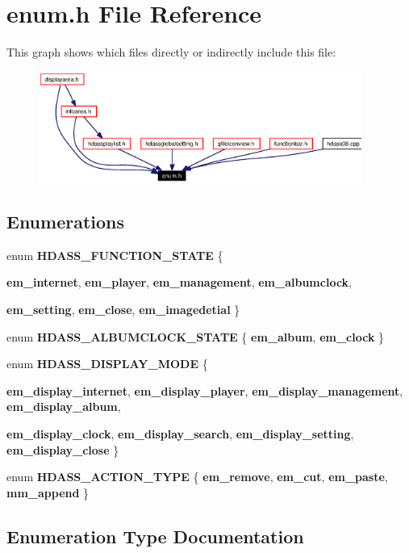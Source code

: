 \section{enum.h File Reference}
\label{enum_8h}




This graph shows which files directly or indirectly include this file:\begin{figure}[H]
\begin{center}
\leavevmode
\includegraphics[width=300pt]{enum_8h__dep__incl}
\end{center}
\end{figure}
\subsection*{Enumerations}
\begin{CompactItemize}
\item 
enum {\bf HDASS\_\-FUNCTION\_\-STATE} \{ \par
{\bf em\_\-internet}, 
{\bf em\_\-player}, 
{\bf em\_\-management}, 
{\bf em\_\-albumclock}, 
\par
{\bf em\_\-setting}, 
{\bf em\_\-close}, 
{\bf em\_\-imagedetial}
 \}
\item 
enum {\bf HDASS\_\-ALBUMCLOCK\_\-STATE} \{ {\bf em\_\-album}, 
{\bf em\_\-clock}
 \}
\item 
enum {\bf HDASS\_\-DISPLAY\_\-MODE} \{ \par
{\bf em\_\-display\_\-internet}, 
{\bf em\_\-display\_\-player}, 
{\bf em\_\-display\_\-management}, 
{\bf em\_\-display\_\-album}, 
\par
{\bf em\_\-display\_\-clock}, 
{\bf em\_\-display\_\-search}, 
{\bf em\_\-display\_\-setting}, 
{\bf em\_\-display\_\-close}
 \}
\item 
enum {\bf HDASS\_\-ACTION\_\-TYPE} \{ {\bf em\_\-remove}, 
{\bf em\_\-cut}, 
{\bf em\_\-paste}, 
{\bf mm\_\-append}
 \}
\end{CompactItemize}


\subsection{Enumeration Type Documentation}
